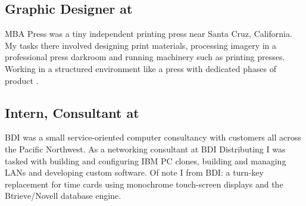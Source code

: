 \subsection{\textbf{Graphic Designer} at   \shyears{[1993-1995]}}
MBA Press was a tiny independent printing press near Santa Cruz, California.  My tasks there involved designing print materials, processing imagery in a professional press darkroom and running machinery such as printing presses.  Working in a structured environment like a press with dedicated phases of product .

\subsection{\textbf{Intern, Consultant} at  \shyears{[1990-1993]}}
BDI was a small service-oriented computer consultancy with customers all across the Pacific Northwest.  As a networking consultant at BDI Distributing I was tasked with building and configuring IBM PC clones, building and managing LANs and developing custom software.  Of note I  from BDI: a turn-key replacement for time cards using monochrome touch-screen displays and the Btrieve/Novell database engine.
